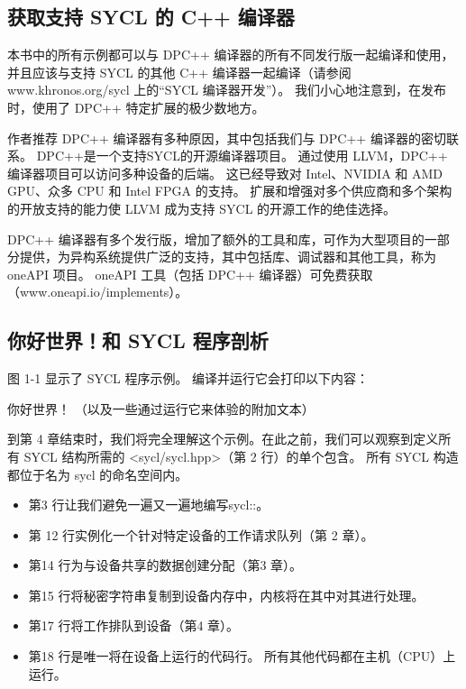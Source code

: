 \subsection{获取支持 SYCL 的 C++ 编译器}
本书中的所有示例都可以与 DPC++ 编译器的所有不同发行版一起编译和使用，并且应该与支持 SYCL 的其他 C++ 编译器一起编译（请参阅 www.khronos.org/sycl 上的“SYCL 编译器开发”）。 我们小心地注意到，在发布时，使用了 DPC++ 特定扩展的极少数地方。

作者推荐 DPC++ 编译器有多种原因，其中包括我们与 DPC++ 编译器的密切联系。 DPC++是一个支持SYCL的开源编译器项目。 通过使用 LLVM，DPC++ 编译器项目可以访问多种设备的后端。 这已经导致对 Intel、NVIDIA 和 AMD GPU、众多 CPU 和 Intel FPGA 的支持。 扩展和增强对多个供应商和多个架构的开放支持的能力使 LLVM 成为支持 SYCL 的开源工作的绝佳选择。

DPC++ 编译器有多个发行版，增加了额外的工具和库，可作为大型项目的一部分提供，为异构系统提供广泛的支持，其中包括库、调试器和其他工具，称为 oneAPI 项目。 oneAPI 工具（包括 DPC++ 编译器）可免费获取（www.oneapi.io/implements）。

\subsection{你好世界！和 SYCL 程序剖析}
图 1-1 显示了 SYCL 程序示例。 编译并运行它会打印以下内容：

你好世界！ （以及一些通过运行它来体验的附加文本）

到第 4 章结束时，我们将完全理解这个示例。在此之前，我们可以观察到定义所有 SYCL 结构所需的 <sycl/sycl.hpp>（第 2 行）的单个包含。 所有 SYCL 构造都位于名为 sycl 的命名空间内。

\begin{itemize}
	\item 第3 行让我们避免一遍又一遍地编写sycl::。

	\item 第 12 行实例化一个针对特定设备的工作请求队列（第 2 章）。

	\item 第14 行为与设备共享的数据创建分配（第3 章）。

	\item 第15 行将秘密字符串复制到设备内存中，内核将在其中对其进行处理。

	\item 第17 行将工作排队到设备（第4 章）。

	\item 第18 行是唯一将在设备上运行的代码行。 所有其他代码都在主机（CPU）上运行。
\end{itemize}

